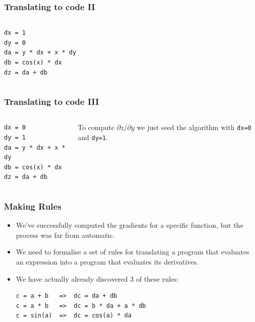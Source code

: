 \documentclass[]{article}
\begin{document}
\begin{frame}[fragile]
\frametitle{Translating to code II}

\begin{columns}
\begin{lstlisting}
dx = 1
dy = 0
da = y * dx + x * dy
db = cos(x) * dx
dz = da + db	
\end{lstlisting}


\end{columns}
\end{frame}


\begin{frame}[fragile]
\frametitle{Translating to code III}

\begin{columns}
\begin{lstlisting}
dx = 0
dy = 1
da = y * dx + x * dy
db = cos(x) * dx
dz = da + db	
\end{lstlisting}


To compute $\partial z/\partial y$ we just seed the algorithm with \lstinline!dx=0! and \lstinline!dy=1!.
\end{columns}
\end{frame}

\begin{frame}[fragile]
\frametitle{Making Rules}

\begin{itemize}
	\item<+-> We've successfully computed the gradients for a specific function, but the process was far from automatic. 
	\item<+-> We need to formalise a set of rules for translating a program that evaluates an expression into a program that evaluates its derivatives.
	\item<+-> We have actually already discovered 3 of these rules:
\begin{lstlisting}
c = a + b   =>  dc = da + db
c = a * b   =>  dc = b * da + a * db
c = sin(a)  =>  dc = cos(a) * da
\end{lstlisting}
\end{itemize}

\end{frame}
\end{document}
